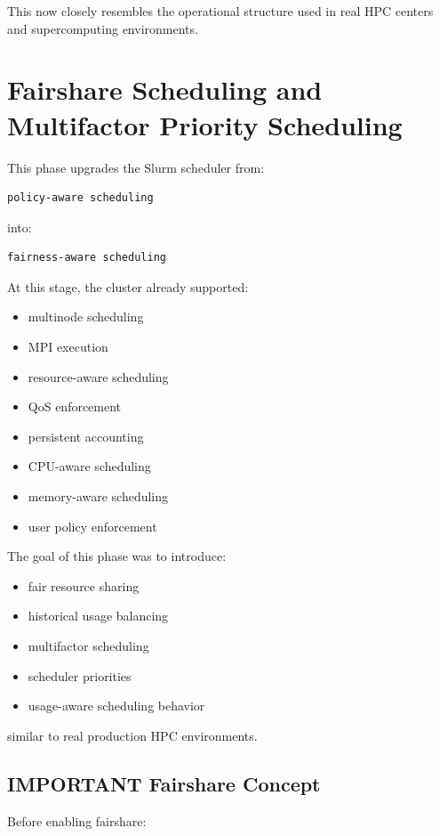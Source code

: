 \documentclass[11pt]{article}
\begin{document}
This now closely resembles the operational structure used in real HPC
centers and supercomputing environments.
\section{Fairshare Scheduling and Multifactor Priority Scheduling}
\label{sec:org3a170a8}

This phase upgrades the Slurm scheduler from:

\begin{verbatim}
policy-aware scheduling
\end{verbatim}

into:

\begin{verbatim}
fairness-aware scheduling
\end{verbatim}

At this stage, the cluster already supported:

\begin{itemize}
\item multinode scheduling
\item MPI execution
\item resource-aware scheduling
\item QoS enforcement
\item persistent accounting
\item CPU-aware scheduling
\item memory-aware scheduling
\item user policy enforcement
\end{itemize}

The goal of this phase was to introduce:

\begin{itemize}
\item fair resource sharing
\item historical usage balancing
\item multifactor scheduling
\item scheduler priorities
\item usage-aware scheduling behavior
\end{itemize}

similar to real production HPC environments.
\subsection{IMPORTANT Fairshare Concept}
\label{sec:org298bcae}

Before enabling fairshare:
\end{document}

